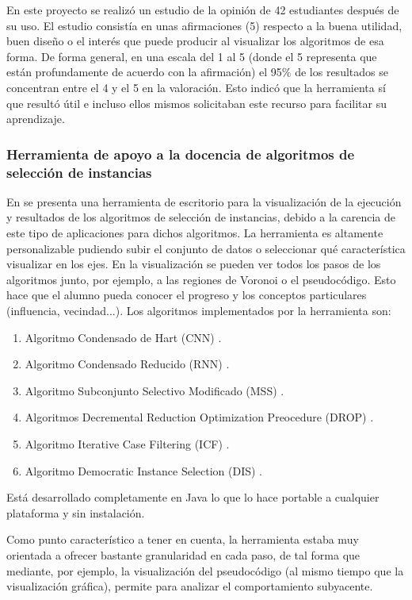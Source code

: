 En este proyecto se realizó un estudio de la opinión de 42 estudiantes después
de su uso. El estudio consistía en unas afirmaciones (5) respecto a la buena
utilidad, buen diseño o el interés que puede producir al visualizar los
algoritmos de esa forma. De forma general, en una escala del 1 al 5 (donde el 5
representa que están profundamente de acuerdo con la afirmación) el 95\% de los
resultados se concentran entre el 4 y el 5 en la valoración. Esto indicó que la
herramienta sí que resultó útil e incluso ellos mismos solicitaban este recurso
para facilitar su aprendizaje.

\subsubsection{Herramienta de apoyo a la docencia de algoritmos de selección de instancias}
En \cite{arnaiz2012herramienta} se presenta una herramienta de escritorio para
la visualización de la ejecución y resultados de los algoritmos de selección de
instancias, debido a la carencia de este tipo de aplicaciones para dichos
algoritmos. La herramienta es altamente personalizable pudiendo subir el
conjunto de datos o seleccionar qué característica visualizar en los ejes. En la
visualización se pueden ver todos los pasos de los algoritmos junto, por
ejemplo, a las regiones de Voronoi o el pseudocódigo. Esto hace que el alumno
pueda conocer el progreso y los conceptos particulares (influencia,
vecindad...). Los algoritmos implementados por la herramienta son:
\begin{enumerate}
    \item Algoritmo Condensado de Hart (CNN) \cite{CNNHart1968}.
    \item Algoritmo Condensado Reducido (RNN) \cite{RNNGates1972}.
    \item Algoritmo Subconjunto Selectivo Modificado (MSS) \cite{MSSBarandela2005}.
    \item Algoritmos Decremental Reduction Optimization Preocedure (DROP) \cite{DROPWilson2000}.
    \item Algoritmo Iterative Case Filtering (ICF) \cite{ICFBrighton2002}.
    \item Algoritmo Democratic Instance Selection (DIS) \cite{DemoISGarcia2010}.
\end{enumerate}
Está desarrollado completamente en Java lo que lo hace portable a cualquier
plataforma y sin instalación.

Como punto característico a tener en cuenta, la herramienta estaba muy orientada
a ofrecer bastante granularidad en cada paso, de tal forma que mediante, por
ejemplo, la visualización del pseudocódigo (al mismo tiempo que la visualización
gráfica), permite para analizar el comportamiento subyacente.


